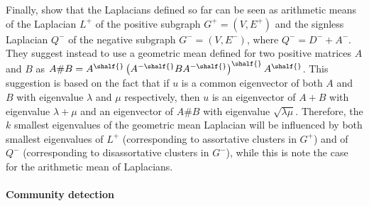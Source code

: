 Finally, \textcite{mGeometricMean16} show that the Laplacians defined so far can be seen as
arithmetic means of the Laplacian $L^+$ of the positive subgraph $G^+=(V, E^+)$ and the signless
Laplacian $Q^-$ of the negative subgraph $G^-=(V, E^-)$, where $Q^- = D^- + A^-$. They suggest
instead to use a geometric mean defined for two positive matrices $A$ and $B$ as $A\#B =
A^{\shalf{}} \left(A^{-\shalf{}} BA^{-\shalf{}} \right)^{\shalf{}} A^{\shalf{}}$. This suggestion is
based on the fact that if $u$ is a common eigenvector of both $A$ and $B$ with eigenvalue $\lambda$
and $\mu$ respectively, then $u$ is an eigenvector of $A+B$ with eigenvalue $\lambda+\mu$ and an
eigenvector of $A\#B$ with eigenvalue $\sqrt{\lambda\mu}$. Therefore, the $k$ smallest eigenvalues
of the geometric mean Laplacian will be influenced by both smallest eigenvalues of $L^+$
(corresponding to assortative clusters in $G^+$) and of $Q^-$ (corresponding to disassortative
clusters in $G^-$), while this is note the case for the arithmetic mean of Laplacians.

\paragraph{Community detection}

